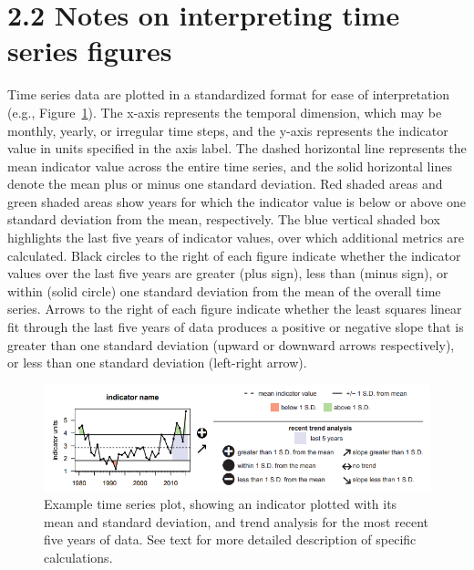 \documentclass[
  letterpaper,
  oneside,
  open=any]{scrbook}
\begin{document}
\hypertarget{notes-on-interpreting-time-series-figures}{%
\section{2.2 Notes on interpreting time series
figures}\label{notes-on-interpreting-time-series-figures}}

Time series data are plotted in a standardized format for ease of
interpretation (e.g., Figure~\ref{fig-2}). The x-axis represents the
temporal dimension, which may be monthly, yearly, or irregular time
steps, and the y-axis represents the indicator value in units specified
in the axis label. The dashed horizontal line represents the mean
indicator value across the entire time series, and the solid horizontal
lines denote the mean plus or minus one standard deviation. Red shaded
areas and green shaded areas show years for which the indicator value is
below or above one standard deviation from the mean, respectively. The
blue vertical shaded box highlights the last five years of indicator
values, over which additional metrics are calculated. Black circles to
the right of each figure indicate whether the indicator values over the
last five years are greater (plus sign), less than (minus sign), or
within (solid circle) one standard deviation from the mean of the
overall time series. Arrows to the right of each figure indicate whether
the least squares linear fit through the last five years of data
produces a positive or negative slope that is greater than one standard
deviation (upward or downward arrows respectively), or less than one
standard deviation (left-right arrow).

\begin{figure}

{\centering \includegraphics{Report_book_files/images/indicator_selection_diagram.png}

}

\caption{\label{fig-2}Example time series plot, showing an indicator
plotted with its mean and standard deviation, and trend analysis for the
most recent five years of data. See text for more detailed description
of specific calculations.}

\end{figure}
\end{document}
